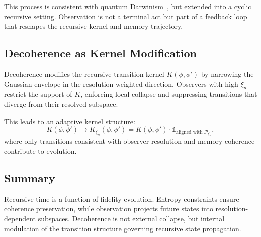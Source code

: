 This process is consistent with quantum Darwinism~\cite{zurek2003decoherence}, but extended into a cyclic recursive setting. Observation is not a terminal act but part of a feedback loop that reshapes the recursive kernel and memory trajectory.

\subsection{Decoherence as Kernel Modification}

Decoherence modifies the recursive transition kernel $K(\phi, \phi')$ by narrowing the Gaussian envelope in the resolution-weighted direction. Observers with high $\xi_n$ restrict the support of $K$, enforcing local collapse and suppressing transitions that diverge from their resolved subspace.

This leads to an adaptive kernel structure:
\[
K(\phi, \phi') \to K_{\xi_n}(\phi, \phi') = K(\phi, \phi') \cdot \mathbb{1}_{\text{aligned with } \mathcal{P}_{\xi_n}},
\]
where only transitions consistent with observer resolution and memory coherence contribute to evolution.

\subsection{Summary}

Recursive time is a function of fidelity evolution. Entropy constraints ensure coherence preservation, while observation projects future states into resolution-dependent subspaces. Decoherence is not external collapse, but internal modulation of the transition structure governing recursive state propagation.
